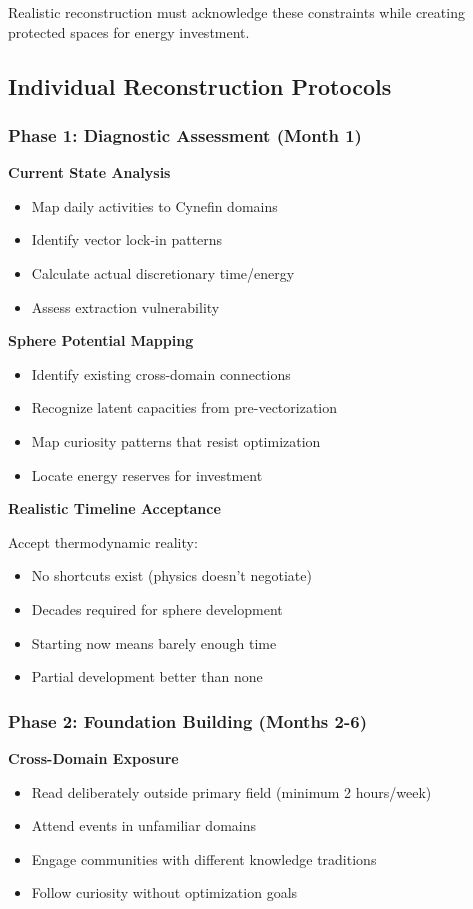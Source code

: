 Realistic reconstruction must acknowledge these constraints while creating protected spaces for energy investment.

\subsection{Individual Reconstruction Protocols}

\subsubsection{Phase 1: Diagnostic Assessment (Month 1)}

\textbf{Current State Analysis}
\begin{itemize}
\item Map daily activities to Cynefin domains
\item Identify vector lock-in patterns
\item Calculate actual discretionary time/energy
\item Assess extraction vulnerability
\end{itemize}

\textbf{Sphere Potential Mapping}
\begin{itemize}
\item Identify existing cross-domain connections
\item Recognize latent capacities from pre-vectorization
\item Map curiosity patterns that resist optimization
\item Locate energy reserves for investment
\end{itemize}

\textbf{Realistic Timeline Acceptance}

Accept thermodynamic reality:
\begin{itemize}
\item No shortcuts exist (physics doesn't negotiate)
\item Decades required for sphere development
\item Starting now means barely enough time
\item Partial development better than none
\end{itemize}

\subsubsection{Phase 2: Foundation Building (Months 2-6)}

\textbf{Cross-Domain Exposure}
\begin{itemize}
\item Read deliberately outside primary field (minimum 2 hours/week)
\item Attend events in unfamiliar domains
\item Engage communities with different knowledge traditions
\item Follow curiosity without optimization goals
\end{itemize}

